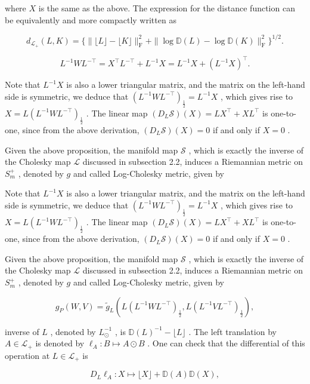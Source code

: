 \documentclass[11pt]{article}
\begin{document}
where  $X$  is the same as the above. The expression for the distance function can be equivalently and more compactly written as

$$
d _ {\mathcal {L} _ {+}} (L, K) = \{\| \lfloor L \rfloor - \lfloor K \rfloor \| _ {\mathrm {F}} ^ {2} + \| \log \mathbb {D} (L) - \log \mathbb {D} (K) \| _ {\mathrm {F}} ^ {2} \} ^ {1 / 2}.
$$

$$
L ^ {- 1} W L ^ {- \top} = X ^ {\top} L ^ {- \top} + L ^ {- 1} X = L ^ {- 1} X + (L ^ {- 1} X) ^ {\top}.
$$

Note that  $L^{-1}X$  is also a lower triangular matrix, and the matrix on the left-hand side is symmetric, we deduce that  $(L^{-1}WL^{-\top})_{\frac{1}{2}} = L^{-1}X$ , which gives rise to  $X = L(L^{-1}WL^{-\top})_{\frac{1}{2}}$ . The linear map  $(D_L\mathcal{S})(X) = LX^\top +XL^\top$  is one-to-one, since from the above derivation,  $(D_L\mathcal{S})(X) = 0$  if and only if  $X = 0$ .

Given the above proposition, the manifold map  $\mathcal{S}$ , which is exactly the inverse of the Cholesky map  $\mathcal{L}$  discussed in subsection 2.2, induces a Riemannian metric on  $S_{m}^{+}$ , denoted by  $g$  and called Log-Cholesky metric, given by

Note that  $L^{-1}X$  is also a lower triangular matrix, and the matrix on the left-hand side is symmetric, we deduce that  $(L^{-1}WL^{-\top})_{\frac{1}{2}} = L^{-1}X$ , which gives rise to  $X = L(L^{-1}WL^{-\top})_{\frac{1}{2}}$ . The linear map  $(D_L\mathcal{S})(X) = LX^\top +XL^\top$  is one-to-one, since from the above derivation,  $(D_L\mathcal{S})(X) = 0$  if and only if  $X = 0$ .

Given the above proposition, the manifold map  $\mathcal{S}$ , which is exactly the inverse of the Cholesky map  $\mathcal{L}$  discussed in subsection 2.2, induces a Riemannian metric on  $S_{m}^{+}$ , denoted by  $g$  and called Log-Cholesky metric, given by

$$
g _ {P} (W, V) = \tilde {g} _ {L} \left(L \left(L ^ {- 1} W L ^ {- \top}\right) _ {\frac {1}{2}}, L \left(L ^ {- 1} V L ^ {- \top}\right) _ {\frac {1}{2}}\right), \tag {3.1}
$$

inverse of  $L$ , denoted by  $L_{\odot}^{-1}$ , is  $\mathbb{D}(L)^{-1} - \lfloor L\rfloor$ . The left translation by  $A\in \mathcal{L}_{+}$  is denoted by  $\ell_A:B\mapsto A\odot B$ . One can check that the differential of this operation at  $L\in \mathcal{L}_{+}$  is

$$
D _ {L} \ell_ {A}: X \mapsto \lfloor X \rfloor + \mathbb {D} (A) \mathbb {D} (X), \tag {3.2}
$$
\end{document}
